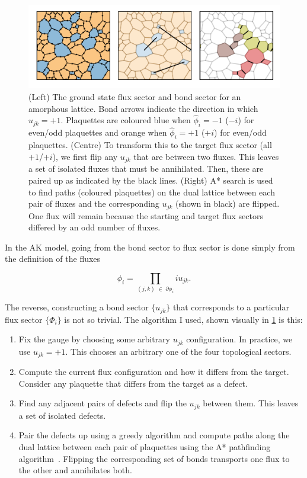 \hypertarget{fig:flux_finding}{%
\begin{figure}
\centering
\includegraphics[width=1\textwidth,height=\textheight]{figure_code/amk_chapter/flux_finding/flux_finding}
\caption[{Finding Bond Sectors from Flux Sectors}]{(Left) The ground state flux sector and bond sector for an amorphous lattice. Bond arrows indicate the direction in which \(u_{jk} = +1\). Plaquettes are coloured blue when \(\hat{\phi}_i = -1\) (\(-i\)) for even/odd plaquettes and orange when \(\hat{\phi}_i = +1\) (\(+i\)) for even/odd plaquettes. (Centre) To transform this to the target flux sector (all \(+1\)/\(+i\)), we first flip any \(u_{jk}\) that are between two fluxes. This leaves a set of isolated fluxes that must be annihilated. Then, these are paired up as indicated by the black lines. (Right) A* search is used to find paths (coloured plaquettes) on the dual lattice between each pair of fluxes and the corresponding \(u_{jk}\) (shown in black) are flipped. One flux will remain because the starting and target flux sectors differed by an odd number of fluxes.}
\label{fig:flux_finding}
\end{figure}
}

In the AK model, going from the bond sector to flux sector is done simply from the definition of the fluxes

\[ \phi_i = \prod_{(j,k) \; \in \; \partial \phi_i} i u_{jk}.\]

The reverse, constructing a bond sector \(\{u_{jk}\}\) that corresponds to a particular flux sector \(\{\Phi_i\}\) is not so trivial. The algorithm I used, shown visually in \cref{fig:flux_finding} is this:

\begin{enumerate}
\def\labelenumi{\arabic{enumi}.}
\item
  Fix the gauge by choosing some arbitrary \(u_{jk}\) configuration. In practice, we use \(u_{jk} = +1\). This chooses an arbitrary one of the four topological sectors.
\item
  Compute the current flux configuration and how it differs from the target. Consider any plaquette that differs from the target as a defect.
\item
  Find any adjacent pairs of defects and flip the \(u_{jk}\) between them. This leaves a set of isolated defects.
\item
  Pair the defects up using a greedy algorithm and compute paths along the dual lattice between each pair of plaquettes using the A* pathfinding algorithm~\autocite{hartFormalBasisHeuristic1968}. Flipping the corresponding set of bonds transports one flux to the other and annihilates both.
\end{enumerate}
